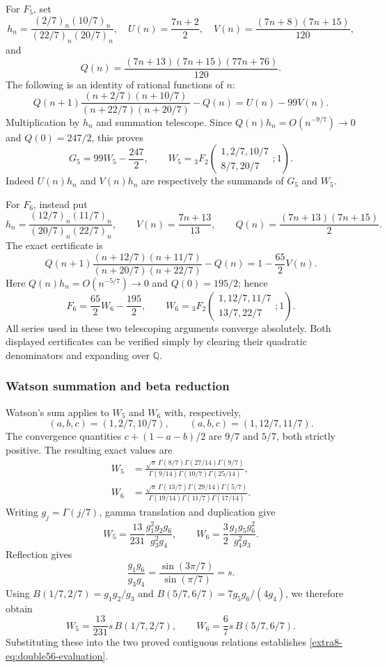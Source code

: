 \documentclass[11pt,a4paper]{article}
\theoremstyle{definition}
\theoremstyle{remark}
\numberwithin{equation}{section}
\begin{document}
For $F_5$, set
\[
 h_n=\frac{(2/7)_n(10/7)_n}{(22/7)_n(20/7)_n},\quad
 U(n)=\frac{7n+2}{2},\quad
 V(n)=\frac{(7n+8)(7n+15)}{120},
\]
and
\[
 Q(n)=\frac{(7n+13)(7n+15)(77n+76)}{120}.
\]
The following is an identity of rational functions of $n$:
\begin{equation}\label{extra8-eq:double5-certificate}
 Q(n+1)\frac{(n+2/7)(n+10/7)}{(n+22/7)(n+20/7)}-Q(n)
   =U(n)-99V(n).
\end{equation}
Multiplication by $h_n$ and summation telescope. Since
$Q(n)h_n=O(n^{-9/7})\longrightarrow0$ and $Q(0)=247/2$, this proves
\[
 G_5=99W_5-\frac{247}{2},\qquad
 W_5={}_3F_2\!\left(\begin{matrix}1,2/7,10/7\\8/7,20/7\end{matrix};1\right).
\]
Indeed $U(n)h_n$ and $V(n)h_n$ are respectively the summands of $G_5$
and $W_5$.

For $F_6$, instead put
\[
 h_n=\frac{(12/7)_n(11/7)_n}{(20/7)_n(22/7)_n},\qquad
 V(n)=\frac{7n+13}{13},\qquad
 Q(n)=\frac{(7n+13)(7n+15)}{2}.
\]
The exact certificate is
\begin{equation}\label{extra8-eq:double6-certificate}
 Q(n+1)\frac{(n+12/7)(n+11/7)}{(n+20/7)(n+22/7)}-Q(n)
    =1-\frac{65}{2}V(n).
\end{equation}
Here $Q(n)h_n=O(n^{-5/7})\longrightarrow0$ and $Q(0)=195/2$; hence
\[
 F_6=\frac{65}{2}W_6-\frac{195}{2},\qquad
 W_6={}_3F_2\!\left(\begin{matrix}1,12/7,11/7\\13/7,22/7\end{matrix};1\right).
\]
All series used in these two telescoping arguments converge absolutely.
Both displayed certificates can be verified simply by clearing their
quadratic denominators and expanding over $\mathbb Q$.

\subsubsection{Watson summation and beta reduction}

Watson's sum \cite[Eq.~16.4.6]{extra8-dlmf} applies to $W_5$ and $W_6$ with,
respectively,
\[
 (a,b,c)=(1,2/7,10/7),\qquad (a,b,c)=(1,12/7,11/7).
\]
The convergence quantities $c+(1-a-b)/2$ are $9/7$ and $5/7$, both
strictly positive. The resulting exact values are
\begin{align*}
 W_5&=\frac{\sqrt\pi\,\Gamma(8/7)\Gamma(27/14)\Gamma(9/7)}
                 {\Gamma(9/14)\Gamma(10/7)\Gamma(25/14)},\\
 W_6&=\frac{\sqrt\pi\,\Gamma(13/7)\Gamma(29/14)\Gamma(5/7)}
                 {\Gamma(19/14)\Gamma(11/7)\Gamma(17/14)}.
\end{align*}
Writing $g_j=\Gamma(j/7)$, gamma translation and duplication give
\[
 W_5=\frac{13}{231}\frac{g_1^2g_2g_6}{g_3^2g_4},\qquad
 W_6=\frac32\frac{g_1g_5g_6^2}{g_4^2g_3}.
\]
Reflection gives
\[
 \frac{g_1g_6}{g_3g_4}
  =\frac{\sin(3\pi/7)}{\sin(\pi/7)}=s.
\]
Using $B(1/7,2/7)=g_1g_2/g_3$ and
$B(5/7,6/7)=7g_5g_6/(4g_4)$, we therefore obtain
\[
 W_5=\frac{13}{231}s\,B(1/7,2/7),\qquad
 W_6=\frac67s\,B(5/7,6/7).
\]
Substituting these into the two proved contiguous relations establishes
\eqref{extra8-eq:double56-evaluation}.
\end{document}
